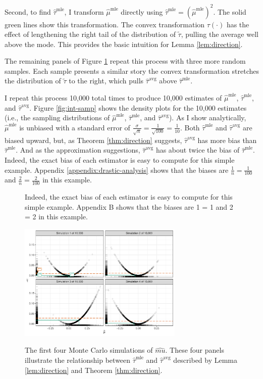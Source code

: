 \documentclass[12pt]{article}
\begin{document}
Second, to find $\hat{\tau}^\text{mle}$, I transform $\hat{\mu}^\text{mle}$ directly using $\hat{\tau}^\text{mle} = \left( \hat{\mu}^\text{mle} \right) ^2$.
The solid green lines show this transformation.
The convex transformation $\tau(\cdot)$ has the effect of lengthening the right tail of the distribution of $\tilde{\tau}$, pulling the average well above the mode.
This provides the basic intuition for Lemma \ref{lem:direction}.

The remaining panels of Figure \ref{fig:samp} repeat this process with three more random samples.
Each sample presents a similar story \textemdash{} the convex transformation stretches the distribution of $\tilde{\tau}$ to the right, which pulls $\hat{\tau}^\text{avg}$ above $\hat{\tau}^\text{mle}$.

I repeat this process 10,000 total times to produce 10,000 estimates of $\hat{\mu}^\text{mle}$, $\hat{\tau}^\text{mle}$, and $\hat{\tau}^\text{avg}$.
Figure \ref{fig:int-samp} shows the density plots for the 10,000 estimates (i.e., the sampling distributions of $\hat{\mu}^\text{mle}$, $\hat{\tau}^\text{mle}$, and $\hat{\tau}^\text{avg}$).
As I show analytically, $\hat{\mu}^\text{mle}$ is unbiased with a standard error of $\frac{\sigma}{\sqrt{n}} = \frac{1}{\sqrt{100}} = \frac{1}{10}$.
Both $\hat{\tau}^\text{mle}$ and $\hat{\tau}^\text{avg}$ are biased upward, but, as Theorem \ref{thm:direction} suggests, $\hat{\tau}^\text{avg}$ has more bias than $\hat{\tau}^\text{mle}$. And as the approximation suggestions, $\hat{\tau}^\text{avg}$ has about twice the bias of $\hat{\tau}^\text{mle}$. Indeed, the exact bias of each estimator is easy to compute for this simple example. Appendix \ref{appendix:drastic-analysis} shows that the biases are $\frac{1}{n} = \frac{1}{100}$ and $\frac{2}{n} = \frac{2}{100}$ in this example.

\begin{figure}[!h]Indeed, the exact bias of each estimator is easy to compute for this simple example.
Appendix B shows that the biases are 1 = 1 and 2 = 2 in this example.
\begin{center}
\includegraphics[width = 0.7\textwidth]{figs/intuition.pdf}\\
\vspace{.03in}
\caption{The first four Monte Carlo simulations of $\hat{mu}$. These four panels illustrate the relationship between $\hat{\tau}^\text{mle}$ and $\hat{\tau}^\text{avg}$ described by Lemma \ref{lem:direction} and Theorem \ref{thm:direction}.}\label{fig:samp}
\end{center}
\end{figure}
\end{document}
